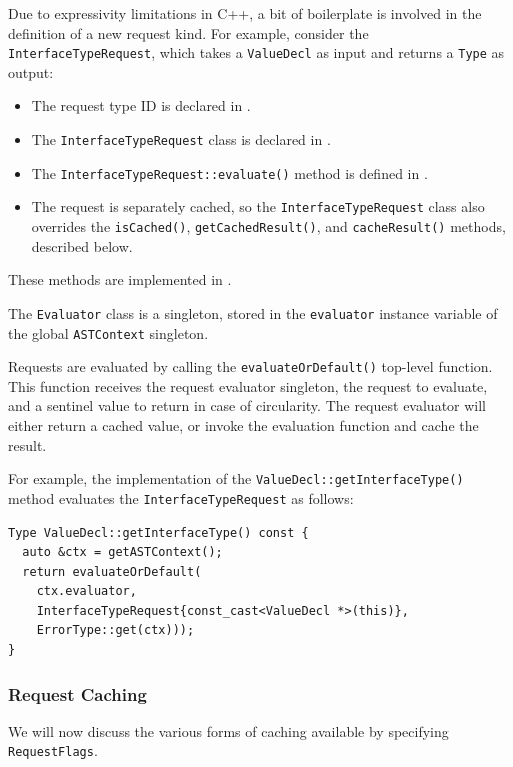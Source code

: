 \documentclass[../generics]{subfiles}
\begin{document}
Due to expressivity limitations in C++, a bit of boilerplate is involved in the definition of a new request kind. For example, consider the \texttt{InterfaceTypeRequest}, which takes a \texttt{ValueDecl} as input and returns a \texttt{Type} as output:
\begin{itemize}
\item \begingroup \raggedright The request type ID is declared in .
\item The \texttt{InterfaceTypeRequest} class is declared in .
\item The \texttt{InterfaceTypeRequest::evaluate()} method is defined in .
\item \endgroup The request is separately cached, so the \texttt{InterfaceTypeRequest} class also overrides the \texttt{isCached()}, \texttt{getCachedResult()}, and \texttt{cacheResult()} methods, described below.
\end{itemize}
These methods are implemented in .

The \texttt{Evaluator} class is a singleton, stored in the \texttt{evaluator} instance variable of the global \texttt{ASTContext} singleton.

Requests are evaluated by calling the \texttt{evaluateOrDefault()} top-level function. This function receives the request evaluator singleton, the request to evaluate, and a sentinel value to return in case of circularity. The request evaluator will either return a cached value, or invoke the evaluation function and cache the result.

For example, the implementation of the \texttt{ValueDecl::getInterfaceType()} method evaluates the \texttt{InterfaceTypeRequest} as follows:
\begin{Verbatim}
Type ValueDecl::getInterfaceType() const {
  auto &ctx = getASTContext();
  return evaluateOrDefault(
    ctx.evaluator,
    InterfaceTypeRequest{const_cast<ValueDecl *>(this)},
    ErrorType::get(ctx)));
}
\end{Verbatim}

\subsubsection*{Request Caching}
We will now discuss the various forms of caching available by specifying \texttt{RequestFlags}.
\end{document}
